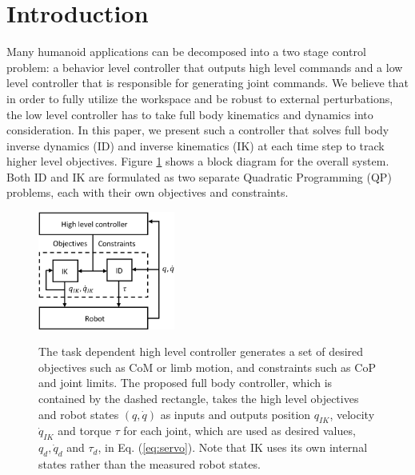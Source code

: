 \documentclass{ws-ijhr}
\newcommand{\eref}[1] {Eq. (\ref{#1})}
\newcommand{\fref}[1] {Figure \ref{#1}}
\begin{document}


\section{Introduction}
Many humanoid applications can be decomposed into a two stage control problem: a 
behavior level controller that outputs high level commands and a low level 
controller that is responsible for generating joint commands. We believe that in order
to fully utilize the workspace and be robust to external perturbations, the low 
level controller has to take full body kinematics and dynamics into consideration. 
In this paper, we present such a controller that solves full body inverse 
dynamics (ID) and inverse kinematics (IK) at each time step to track higher level 
objectives. \fref{fig:sys} shows a block diagram for the 
overall system. 
Both ID and IK are formulated as two separate 
Quadratic Programming (QP) problems, each with their own objectives and 
constraints. 

\begin{figure}
  \begin{center}
    {\includegraphics[width=0.4\textwidth]{images/sys.eps}}
    \caption{
      The task dependent high level controller generates a set of desired 
      objectives such as CoM or limb motion, and constraints such as CoP and 
      joint limits. The proposed full body controller, which is contained by
      the dashed rectangle, takes the high level objectives and robot states 
      $(q,\dot{q})$ as inputs and outputs position $q_{IK}$, velocity 
      $\dot{q}_{IK}$ and torque $\tau$ for each joint, which are used as 
      desired values, $q_d, \dot{q}_d$ and $\tau_d$, in \eref{eq:servo}. Note that IK uses its 
      own internal states rather than the measured robot states. 
      }\label{fig:sys} 
  \end{center}
\end{figure}  
 
\end{document}
